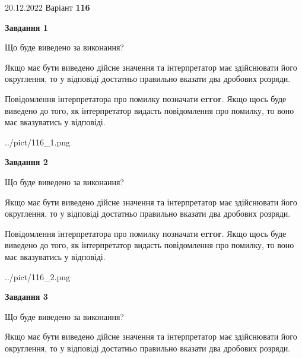 \documentclass[12pt, ukrainian]{article}
\begin{document}
{20.12.2022 Варіант \No \textbf { 116 }\par}
{
\begin {Large}

{\begin {center}\textbf{Завдання 1}\end {center}}\par
Що буде виведено за виконання? \par

Якщо має бути виведено дійсне значення та інтерпретатор має здійснювати його округлення, 
то у відповіді достатньо правильно вказати два дробових розряди.

Повідомлення інтерпретатора про помилку позначати \textbf{error}.
Якщо щось буде виведено до того, як інтерпретатор видасть повідомлення про помилку, 
то воно має вказуватись у відповіді. \par

\begin{center}
	{../pict/116_1.png}
\end{center}
\newpage

{\begin {center}\textbf{Завдання 2}\end {center}}\par
Що буде виведено за виконання? \par

Якщо має бути виведено дійсне значення та інтерпретатор має здійснювати його округлення, 
то у відповіді достатньо правильно вказати два дробових розряди.

Повідомлення інтерпретатора про помилку позначати \textbf{error}.
Якщо щось буде виведено до того, як інтерпретатор видасть повідомлення про помилку, 
то воно має вказуватись у відповіді. \par

\begin{center}
	{../pict/116_2.png}
\end{center}
\newpage

{\begin {center}\textbf{Завдання 3}\end {center}}\par
Що буде виведено за виконання? \par

Якщо має бути виведено дійсне значення та інтерпретатор має здійснювати його округлення, 
то у відповіді достатньо правильно вказати два дробових розряди.


\end{Large}}
\end{document}
